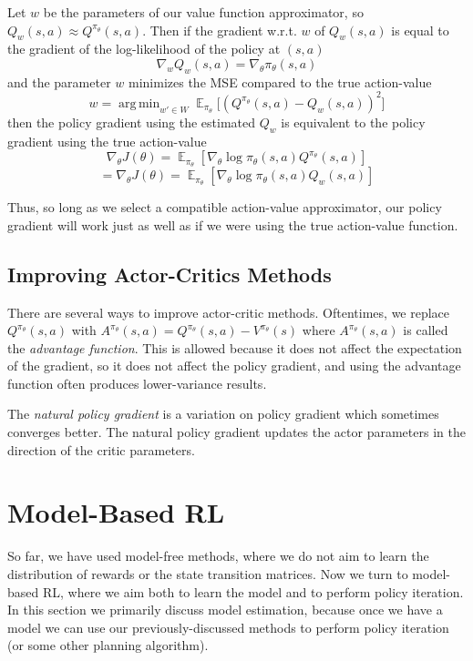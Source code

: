 \documentclass{article}
\DeclareMathOperator*{\argmin}{arg\,min}
\DeclareMathOperator{\EX}{\mathbb{E}}
\newcommand{\ita}{\textit}
\begin{document}
Let $w$ be the parameters of our value function approximator, so $Q_w(s, a)\approx Q^{\pi_\theta}(s, a)$. Then if the gradient w.r.t. $w$ of $Q_w(s, a)$ is equal to the gradient of the log-likelihood of the policy at $(s, a)$
$$\nabla_w Q_w(s, a) = \nabla_\theta \pi_\theta(s, a)$$
and the parameter $w$ minimizes the MSE compared to the true action-value
$$w = \argmin_{w'\in W} \EX_{\pi_\theta}\big[(Q^{\pi_\theta}(s, a) - Q_w(s, a))^2\big]$$
then the policy gradient using the estimated $Q_w$ is equivalent to the policy gradient using the true action-value
$$\nabla_\theta J(\theta)=\EX_{\pi_\theta}[\nabla_\theta\log \pi_\theta(s, a)Q^{\pi_\theta}(s, a)]$$
$$= \nabla_\theta J(\theta)=\EX_{\pi_\theta}[\nabla_\theta\log \pi_\theta(s, a)Q_w(s, a)]$$

Thus, so long as we select a compatible action-value approximator, our policy gradient will work just as well as if we were using the true action-value function.

\subsection{Improving Actor-Critics Methods}

There are several ways to improve actor-critic methods. Oftentimes, we replace $Q^{\pi_\theta}(s, a)$ with $A^{\pi_\theta}(s, a)=Q^{\pi_\theta}(s, a) - V^{\pi_\theta}(s)$ where $A^{\pi_\theta}(s, a)$ is called the \ita{advantage function}. This is allowed because it does not affect the expectation of the gradient, so it does not affect the policy gradient, and using the advantage function often produces lower-variance results.

The \ita{natural policy gradient} is a variation on policy gradient which sometimes converges better. The natural policy gradient updates the actor parameters in the direction of the critic parameters.

\section{Model-Based RL}

So far, we have used model-free methods, where we do not aim to learn the distribution of rewards or the state transition matrices. Now we turn to model-based RL, where we aim both to learn the model and to perform policy iteration. In this section we primarily discuss model estimation, because once we have a model we can use our previously-discussed methods to perform policy iteration (or some other planning algorithm).
\end{document}
